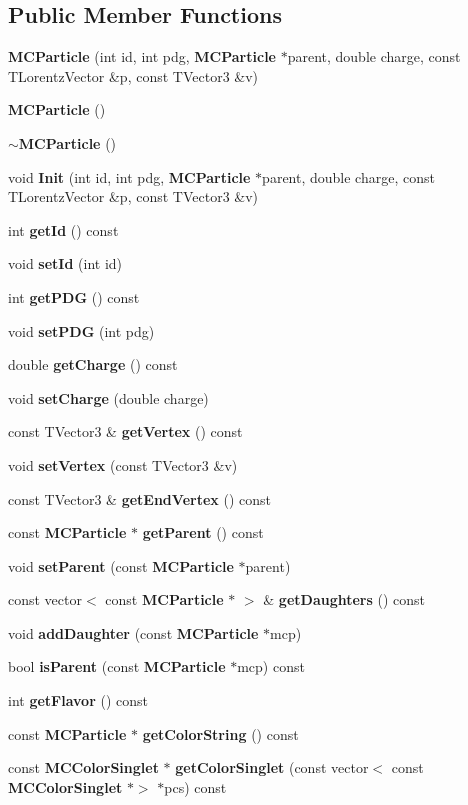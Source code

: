 \subsection*{Public Member Functions}
\begin{DoxyCompactItemize}
\item 
\textbf{ M\+C\+Particle} (int id, int pdg, \textbf{ M\+C\+Particle} $\ast$parent, double charge, const T\+Lorentz\+Vector \&p, const T\+Vector3 \&v)
\item 
\textbf{ M\+C\+Particle} ()
\item 
\textbf{ $\sim$\+M\+C\+Particle} ()
\item 
void \textbf{ Init} (int id, int pdg, \textbf{ M\+C\+Particle} $\ast$parent, double charge, const T\+Lorentz\+Vector \&p, const T\+Vector3 \&v)
\item 
int \textbf{ get\+Id} () const
\item 
void \textbf{ set\+Id} (int id)
\item 
int \textbf{ get\+P\+DG} () const
\item 
void \textbf{ set\+P\+DG} (int pdg)
\item 
double \textbf{ get\+Charge} () const
\item 
void \textbf{ set\+Charge} (double charge)
\item 
const T\+Vector3 \& \textbf{ get\+Vertex} () const
\item 
void \textbf{ set\+Vertex} (const T\+Vector3 \&v)
\item 
const T\+Vector3 \& \textbf{ get\+End\+Vertex} () const
\item 
const \textbf{ M\+C\+Particle} $\ast$ \textbf{ get\+Parent} () const
\item 
void \textbf{ set\+Parent} (const \textbf{ M\+C\+Particle} $\ast$parent)
\item 
const vector$<$ const \textbf{ M\+C\+Particle} $\ast$ $>$ \& \textbf{ get\+Daughters} () const
\item 
void \textbf{ add\+Daughter} (const \textbf{ M\+C\+Particle} $\ast$mcp)
\item 
bool \textbf{ is\+Parent} (const \textbf{ M\+C\+Particle} $\ast$mcp) const
\item 
int \textbf{ get\+Flavor} () const
\item 
const \textbf{ M\+C\+Particle} $\ast$ \textbf{ get\+Color\+String} () const
\item 
const \textbf{ M\+C\+Color\+Singlet} $\ast$ \textbf{ get\+Color\+Singlet} (const vector$<$ const \textbf{ M\+C\+Color\+Singlet} $\ast$$>$ $\ast$pcs) const
$$
\end{DoxyCompactItemize}
